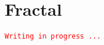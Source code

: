 \newpage

\chapter*{Fractal}

\label{fracdoc}

\texttt{\textcolor{red}{\small Writing in progress ...}}



